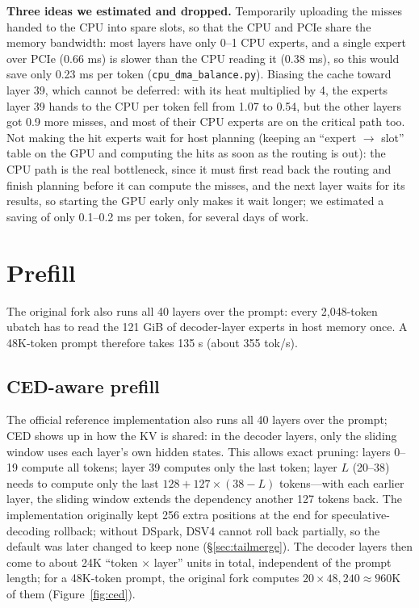 \documentclass[11pt,a4paper]{article}
\newcommand{\code}[1]{\texttt{#1}}
\newcommand{\tps}{tok/s}
\begin{document}
\textbf{Three ideas we estimated and dropped.} Temporarily uploading the misses handed to the CPU into spare slots, so that the CPU and PCIe share the memory bandwidth: most layers have only 0--1 CPU experts, and a single expert over PCIe (0.66 ms) is slower than the CPU reading it (0.38 ms), so this would save only 0.23 ms per token (\code{cpu\_dma\_balance.py}). Biasing the cache toward layer 39, which cannot be deferred: with its heat multiplied by 4, the experts layer 39 hands to the CPU per token fell from 1.07 to 0.54, but the other layers got 0.9 more misses, and most of their CPU experts are on the critical path too. Not making the hit experts wait for host planning (keeping an ``expert $\to$ slot'' table on the GPU and computing the hits as soon as the routing is out): the CPU path is the real bottleneck, since it must first read back the routing and finish planning before it can compute the misses, and the next layer waits for its results, so starting the GPU early only makes it wait longer; we estimated a saving of only 0.1--0.2 ms per token, for several days of work.

\section{Prefill}
\label{sec:prefill}

The original fork also runs all 40 layers over the prompt: every 2,048-token ubatch has to read the 121 GiB of decoder-layer experts in host memory once. A 48K-token prompt therefore takes 135 s (about 355 \tps{}).

\subsection{CED-aware prefill}
\label{sec:ced}

The official reference implementation also runs all 40 layers over the prompt; CED shows up in how the KV is shared: in the decoder layers, only the sliding window uses each layer's own hidden states. This allows exact pruning: layers 0--19 compute all tokens; layer 39 computes only the last token; layer $L$ (20--38) needs to compute only the last $128 + 127 \times (38-L)$ tokens---with each earlier layer, the sliding window extends the dependency another 127 tokens back. The implementation originally kept 256 extra positions at the end for speculative-decoding rollback; without DSpark, DSV4 cannot roll back partially, so the default was later changed to keep none (\S\ref{sec:tailmerge}). The decoder layers then come to about 24K ``token × layer'' units in total, independent of the prompt length; for a 48K-token prompt, the original fork computes $20 \times 48{,}240 \approx 960$K of them (Figure~\ref{fig:ced}).
\end{document}

